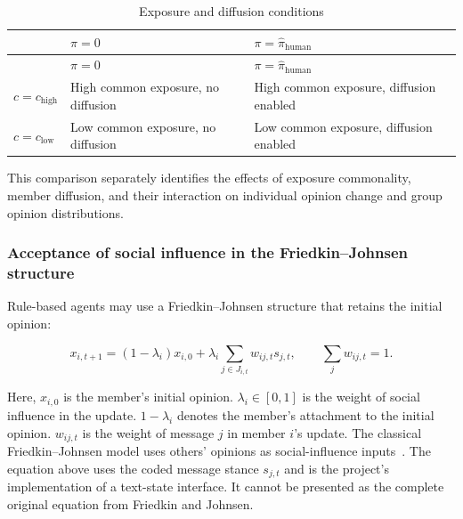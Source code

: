 \documentclass[11pt,a4paper]{article}
\renewcommand{\arraystretch}{1.2}
\begin{document}
\begin{center}
\small
\renewcommand{\arraystretch}{1.18}
\begin{longtable}{@{}>{\RaggedRight\arraybackslash}p{}>{\RaggedRight\arraybackslash}p{}>{\RaggedRight\arraybackslash}p{}@{}}
\caption{Exposure and diffusion conditions}\label{tab:exposure_diffusion}\\
\toprule
\textbf{} & \textbf{$\pi=0$} & \textbf{$\pi=\hat\pi_{\text{human}}$} \\
\midrule
\endfirsthead
\toprule
\textbf{} & \textbf{$\pi=0$} & \textbf{$\pi=\hat\pi_{\text{human}}$} \\
\midrule
\endhead
$c=c_{\text{high}}$ & High common exposure, no diffusion & High common exposure, diffusion enabled \\
$c=c_{\text{low}}$ & Low common exposure, no diffusion & Low common exposure, diffusion enabled \\
\bottomrule
\end{longtable}
\end{center}

This comparison separately identifies the effects of exposure commonality, member diffusion, and their interaction on individual opinion change and group opinion distributions.

\subsubsection{Acceptance of social influence in the Friedkin--Johnsen structure}

Rule-based agents may use a Friedkin--Johnsen structure that retains the initial opinion:

\begin{equation*}
x_{i,t+1}
=
(1-\lambda_i)x_{i,0}
+
\lambda_i
\sum_{j\in J_{i,t}}
w_{ij,t}s_{j,t},
\qquad
\sum_jw_{ij,t}=1.
\end{equation*}

Here, $x_{i,0}$ is the member's initial opinion. $\lambda_i\in[0,1]$ is the weight of social influence in the update. $1-\lambda_i$ denotes the member's attachment to the initial opinion. $w_{ij,t}$ is the weight of message $j$ in member $i$'s update. The classical Friedkin--Johnsen model uses others' opinions as social-influence inputs~\citep{friedkin1990}. The equation above uses the coded message stance $s_{j,t}$ and is the project's implementation of a text-state interface. It cannot be presented as the complete original equation from Friedkin and Johnsen.
\end{document}
